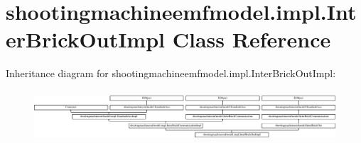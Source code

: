 \hypertarget{classshootingmachineemfmodel_1_1impl_1_1_inter_brick_out_impl}{\section{shootingmachineemfmodel.\-impl.\-Inter\-Brick\-Out\-Impl Class Reference}
\label{classshootingmachineemfmodel_1_1impl_1_1_inter_brick_out_impl}
}
Inheritance diagram for shootingmachineemfmodel.\-impl.\-Inter\-Brick\-Out\-Impl\-:\begin{figure}[H]
\begin{center}
\leavevmode
\includegraphics[height=1.955307cm]{classshootingmachineemfmodel_1_1impl_1_1_inter_brick_out_impl}
\end{center}
\end{figure}
